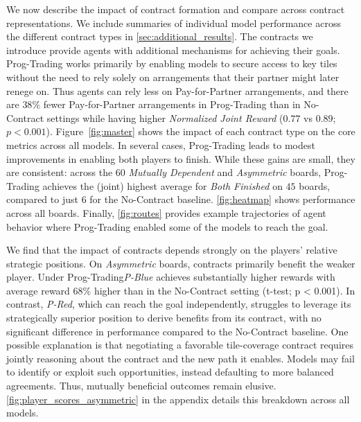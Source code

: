 \documentclass{article} %
\newcommand{\PTC}{Prog-Trading\xspace}
\newcommand{\PforP}{Pay-for-Partner\xspace}
\begin{document}
We now describe the impact of contract formation and compare across contract representations. We include summaries of individual model performance across the different contract types in \cref{sec:additional_results}. The contracts we introduce provide agents with additional mechanisms for achieving their goals. \PTC works primarily by enabling models to secure access to key tiles without the need to rely solely on arrangements that their partner might later renege on. Thus agents can rely less on \PforP arrangements, and there are $38\%$ fewer \PforP arrangements in \PTC than in No-Contract settings while having higher \textit{Normalized Joint Reward}  ($0.77$ vs $0.89$; $p < 0.001$). Figure~\ref{fig:master} shows the impact of each contract type on the core metrics across all models. In several cases, \PTC leads to modest improvements in enabling both players to finish. While these gains are small, they are consistent: across the $60$ \textit{Mutually Dependent} and \textit{Asymmetric} boards, \PTC achieves the (joint) highest average for \textit{Both Finished} on $45$ boards, compared to just $6$ for the No-Contract baseline. \cref{fig:heatmap} shows performance across all boards. Finally, \cref{fig:routes} provides example trajectories of agent behavior where \PTC enabled some of the models to reach the goal.

We find that the impact of contracts depends strongly on the players' relative strategic positions. On \textit{Asymmetric} boards, contracts primarily benefit the weaker player. Under \PTC \textit{P-Blue} achieves substantially higher rewards with average reward $68\%$ higher than in the No-Contract setting (t-test; p < 0.001). 
In contrast, \textit{P-Red}, which can reach the goal independently, struggles to leverage its strategically superior position to derive benefits from its contract, with no significant difference in performance compared to the No-Contract baseline. One possible explanation is that negotiating a favorable tile-coverage contract requires jointly reasoning about the contract and the new path it enables. Models may fail to identify or exploit such opportunities, instead defaulting to more balanced agreements. Thus, mutually beneficial outcomes remain elusive. \cref{fig:player_scores_asymmetric} in the appendix details this breakdown across all models.
\end{document}
